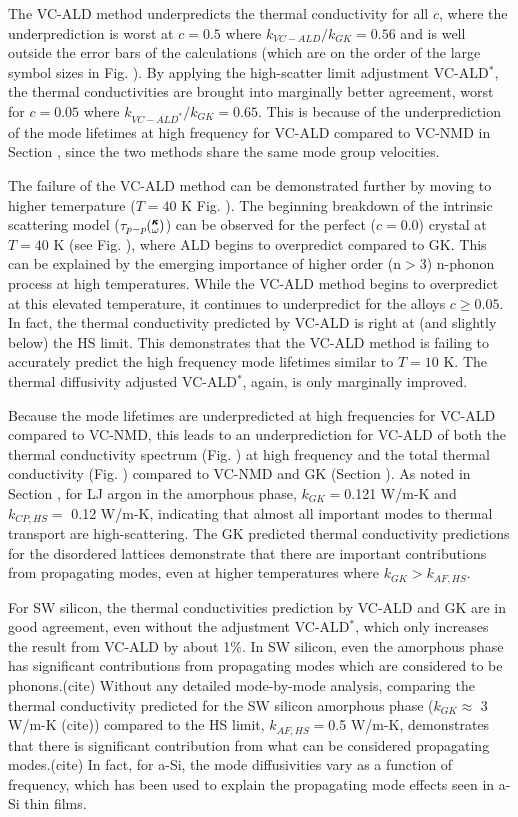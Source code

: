 \documentclass[aps,prb,twocolumn,superscriptaddress,amsmath,amssymb,floatfix]{revtex4}
\newcommand{\kw}{\mspace{-4.0mu}\left(\mspace{-8.0mu}
\begin{smallmatrix}&\pmb{\kappa} \\&\omega\end{smallmatrix}
\mspace{-3.0mu}\right)}
\begin{document}
The VC-ALD method underpredicts the thermal conductivity for all $c$, where 
the underprediction is worst at $c=0.5$ where $k_{VC-ALD} / k_{GK} = 0.56$ 
and is well outside the error bars of the calculations (which are on the order 
of the large symbol sizes in Fig. ). By applying the high-scatter limit 
adjustment VC-ALD$^*$, the thermal conductivities are brought into marginally 
better agreement, worst for $c=0.05$ where $k_{VC-ALD^*} / k_{GK} = 0.65$. 
This is because of the underprediction of the mode lifetimes at high frequency 
for VC-ALD compared to VC-NMD in Section , since the two methods share the 
same mode group velocities. 

The failure of the VC-ALD method can be demonstrated further 
by moving to higher temerpature ($T=40$ K Fig. ).
The beginning breakdown of the intrinsic scattering model 
($\tau_{p-p}\kw$) can be observed for the perfect ($c=0.0$) crystal at 
$T=40$ K (see Fig. ), where ALD begins to overpredict compared to GK.  This 
can be explained by the emerging importance of higher order (n$> 3$) 
n-phonon process at high temperatures.\cite{turney_predicting_2009} 
While the VC-ALD method begins to overpredict at this elevated temperature, 
it continues to underpredict for the alloys $c \ge 0.05$.  In fact, the 
thermal conductivity predicted by VC-ALD is right at (and slightly below) 
the HS limit. This demonstrates that the VC-ALD method is failing to 
accurately predict the high frequency mode lifetimes similar 
to $T=10$ K. The thermal diffusivity adjusted VC-ALD$^*$, again, is 
only marginally improved. 

Because the mode lifetimes are underpredicted at high frequencies for 
VC-ALD compared to VC-NMD, this leads to an underprediction for VC-ALD 
of both the thermal conductivity spectrum (Fig. ) at high 
frequency and the total thermal conductivity (Fig. ) 
compared to VC-NMD and GK (Section ). 
As noted in Section , for LJ argon in the amorphous phase, 
$k_{GK} = $0.121 W/m-K and $k_{CP,HS} =$ 0.12 W/m-K, indicating that 
almost all important modes to thermal transport are high-scattering. The GK 
predicted thermal conductivity predictions for the disordered lattices 
demonstrate that there are 
important contributions from propagating modes, even at higher temperatures 
where $k_{GK} > k_{AF,HS}$. 

For SW silicon, the thermal conductivities prediction by VC-ALD and GK 
are in good agreement, even without the adjustment VC-ALD$^*$, which only 
increases the result from VC-ALD by about 1$\%$. 
In SW silicon, even the amorphous phase has significant contributions 
from propagating modes which are considered to be phonons.(cite) Without 
any detailed mode-by-mode analysis, comparing the thermal 
conductivity predicted for the 
SW silicon amorphous phase ($k_{GK} \approx$ 3 W/m-K (cite)) compared to 
the HS limit, 
$k_{AF,HS} = $0.5 W/m-K, demonstrates that there is significant 
contribution from what can be considered propagating modes.(cite)  
In fact, for a-Si, the mode diffusivities vary as a function 
of frequency,
\cite{feldman_thermal_1993,feldman_numerical_1999,allen_diffusons_1999} 
which has been used to explain the propagating 
mode effects seen in a-Si thin films.\cite{he_heat_2011}
\end{document}
